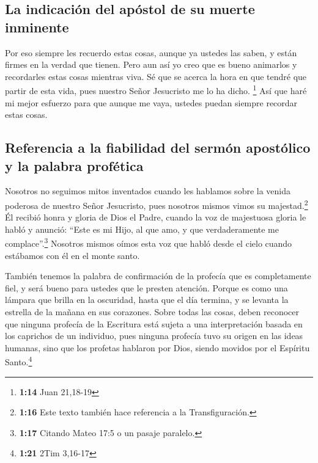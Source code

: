 \hypertarget{la-indicaciuxf3n-del-apuxf3stol-de-su-muerte-inminente}{%
\subsection{La indicación del apóstol de su muerte
inminente}\label{la-indicaciuxf3n-del-apuxf3stol-de-su-muerte-inminente}}

 Por eso siempre les recuerdo estas cosas, aunque ya
ustedes las saben, y están firmes en la verdad que tienen.
 Pero aun así yo creo que es bueno animarlos y
recordarles estas cosas mientras viva.  Sé que se acerca
la hora en que tendré que partir de esta vida, pues nuestro Señor
Jesucristo me lo ha dicho. \footnote{\textbf{1:14} Juan 21,18-19}
 Así que haré mi mejor esfuerzo para que aunque me vaya,
ustedes puedan siempre recordar estas cosas.

\hypertarget{referencia-a-la-fiabilidad-del-sermuxf3n-apostuxf3lico-y-la-palabra-profuxe9tica}{%
\subsection{Referencia a la fiabilidad del sermón apostólico y la
palabra
profética}\label{referencia-a-la-fiabilidad-del-sermuxf3n-apostuxf3lico-y-la-palabra-profuxe9tica}}

 Nosotros no seguimos mitos inventados cuando les
hablamos sobre la venida poderosa de nuestro Señor Jesucristo, pues
nosotros mismos vimos su majestad.\footnote{\textbf{1:16} Este texto
  también hace referencia a la Transfiguración.}  Él
recibió honra y gloria de Dios el Padre, cuando la voz de majestuosa
gloria le habló y anunció: ``Este es mi Hijo, al que amo, y que
verdaderamente me complace''.\footnote{\textbf{1:17} Citando Mateo 17:5
  o un pasaje paralelo.}  Nosotros mismos oímos esta voz
que habló desde el cielo cuando estábamos con él en el monte santo.

 También tenemos la palabra de confirmación de la
profecía que es completamente fiel, y será bueno para ustedes que le
presten atención. Porque es como una lámpara que brilla en la oscuridad,
hasta que el día termina, y se levanta la estrella de la mañana en sus
corazones.  Sobre todas las cosas, deben reconocer que
ninguna profecía de la Escritura está sujeta a una interpretación basada
en los caprichos de un individuo,  pues ninguna profecía
tuvo su origen en las ideas humanas, sino que los profetas hablaron por
Dios, siendo movidos por el Espíritu Santo.\footnote{\textbf{1:21} 2Tim
  3,16-17}


